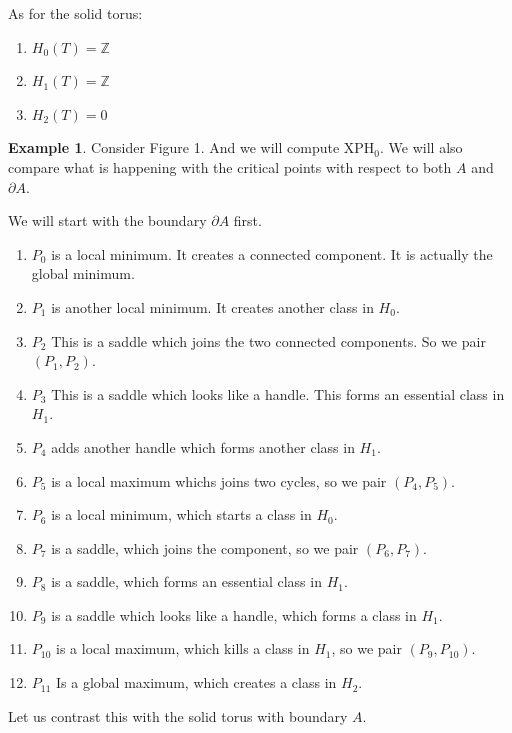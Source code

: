 \documentclass[a4paper]{article}
\theoremstyle{theorem}
\theoremstyle{definition}
\newtheorem{example}{Example}
\theoremstyle{remark}
\theoremstyle{gremark}
\theoremstyle{discussion}
\theoremstyle{notation}
\begin{document}
As for the solid torus:

\begin{enumerate}
	\item $H_0(T)=\mathbb{Z}$
	\item $H_1(T)=\mathbb{Z}$
	\item $H_2(T)=0$
\end{enumerate}



\begin{example}
	Consider Figure 1. And we will compute $\mathrm{XPH}_0$. We will also compare what is happening with the critical points with respect to both $A$ and $\partial A$.
	
	\noindent

			We will start with the boundary $\partial A$ first. 
			

			
			
		\begin{enumerate}
			\item $P_0$ is a local minimum. It creates a connected component. It is actually the global minimum.
			\item $P_1$ is another local minimum. It creates another class in $H_0$.
			\item $P_2$ This is a saddle which joins the two connected components. So we pair $(P_1,P_2)$.
			\item $P_3$ This is a saddle which looks like a handle. This forms an essential class in $H_1$.
			\item $P_4$ adds another handle which forms another class in $H_1$.
			\item $P_5$ is a local maximum whichs joins two cycles, so we pair $(P_4,P_5)$.
			\item $P_6$ is a local minimum, which starts a class in $H_0$.
			\item $P_7$ is a saddle, which joins the component, so we pair $(P_6,P_7)$.
			\item $P_8$ is a saddle, which forms an essential class in $H_1$.
			\item $P_9$ is a saddle which looks like a handle, which forms a class in $H_1$.
			\item $P_{10}$ is a local maximum, which kills a class in $H_1$, so we pair $(P_9,P_{10})$.
			\item $P_{11}$ Is a global maximum, which creates a class in $H_2$.
		\end{enumerate}


\noindent
	Let us contrast this with the solid torus with boundary $A$.
	

\end{example}
\end{document}
